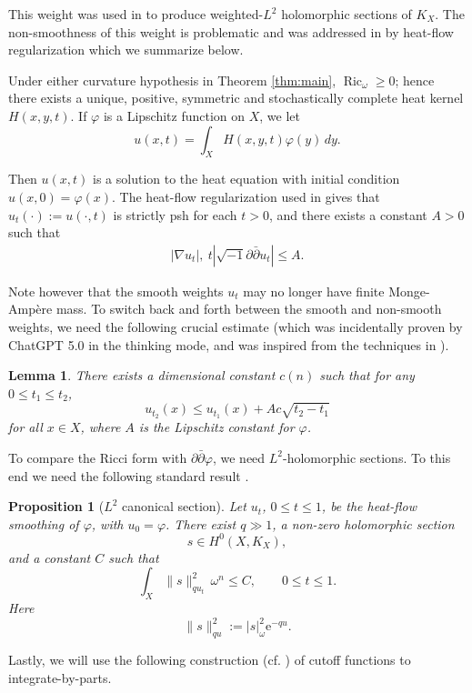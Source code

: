 \documentclass[11pt]{amsart}
\numberwithin{equation}{section}
\newcommand{\ddc}{\sqrt{-1}\partial\bar\partial}
\newcommand{\Ric}{\operatorname{Ric}}
\newcommand{\e}{\mathrm e}
\theoremstyle{plain}
\newtheorem{proposition}[theorem]{Proposition}
\newtheorem{lemma}[theorem]{Lemma}
\theoremstyle{remark}
\begin{document}
This weight was used in \cite{DPS,DPS2} to produce weighted-$L^2$ holomorphic sections of $K_X$. The non-smoothness of this weight is problematic and was addressed in \cite{DPS, DPS2} by heat-flow regularization which we summarize below.

\indent Under either curvature hypothesis in Theorem \ref{thm:main}, $\Ric_{\omega} \geq 0$; hence there exists a unique, positive, symmetric and stochastically complete heat kernel $H(x,y,t)$. If $\varphi$ is a Lipschitz function on $X$, we let $$u(x,t) = \int_X H(x,y,t)\varphi(y)\,dy.$$


 Then $u(x,t)$ is a solution to the heat equation with initial condition $u(x,0)=\varphi(x)$. The heat-flow regularization used in \cite{DPS,NT,NT2} gives that $u_t(\cdot):=u(\cdot,t)$ is strictly psh for each $t>0$, and there exists a constant $A>0$ such that
 \begin{align*}
 |\nabla u_t|,~t|\ddc u_t| \leq A.
  \end{align*}

Note however that the smooth weights $u_t$ may no longer have finite Monge-Amp\`ere mass.  To switch back and forth between the smooth and non-smooth weights, we need the following crucial estimate \cite{DPS} (which was incidentally proven by ChatGPT 5.0 in the thinking mode, and was inspired from the techniques in \cite{Grig}).

\begin{lemma}\label{lem:heat-est}
There exists a dimensional constant $c(n)$ such that for any $0\leq t_1\leq t_2$, $$u_{t_2}(x) \leq u_{t_1}(x) + Ac\sqrt{t_2-t_1}$$ for all $x \in X$, where $A$ is the Lipschitz constant for $\varphi$.
\end{lemma}
\vspace{5mm}

To compare the Ricci form with $\partial \bar{\partial} \varphi$, we need $L^2$-holomorphic sections. To this end we need the following standard result \cite{DPS}.

\begin{proposition}[$L^2$ canonical section]\label{prop:section}
Let $u_t$, $0\le t\le1$, be the heat-flow smoothing of $\varphi$, with $u_0=\varphi$. There exist $q\gg1$, a non-zero holomorphic section
\[
        s\in H^0(X,K_X),
\]
and a constant $C$ such that
\[
        \int_X \|s\|^2_{q u_t}\,\omega^n\le C,
        \qquad 0\le t\le1.
\]
Here
\[
        \|s\|^2_{q u}:=|s|_\omega^2\e^{-q u}.
\]
\end{proposition}


Lastly, we will use the following construction (cf. \cite[Lemma 8]{DPS}) of cutoff functions to integrate-by-parts.
\end{document}
